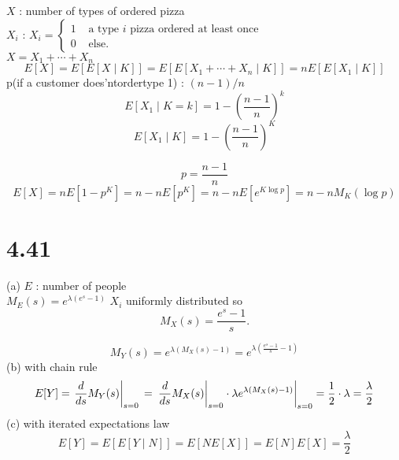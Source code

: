 \documentclass{article}
\begin{document}
		
		$X$ : number of types of ordered pizza \\
		$X_{i}$ : 
		$X_{i}= \begin{cases}1 & \text { a type } i \text { pizza ordered at least once } \\ 0 & \text { else. }\end{cases}$\\
		$X=X_{1}+\cdots+X_{n}$
		$$
		E[X]=E[E[X \mid K]]=E\left[E\left[X_{1}+\cdots+X_{n} \mid K\right]\right]=n E\left[E\left[X_{1} \mid K\right]\right]
		$$
		p(if a customer does'ntordertype 1) : $(n-1) / n$
		$$
		E\left[X_{1} \mid K=k\right]=1-\left(\frac{n-1}{n}\right)^{k}
		$$
		$$
		E\left[X_{1} \mid K\right]=1-\left(\frac{n-1}{n}\right)^{K}
		$$
		
		$$
		p=\frac{n-1}{n}
		$$
		$$
		E[X]=n E\left[1-p^{K}\right]=n-n E\left[p^{K}\right]=n-n E\left[e^{K \log p}\right]=n-n M_{K}(\log p)
		$$


	\section*{4.41}
		(a) $E$ : number of people \\
		$M_{E}(s)=e^{\lambda\left(e^{s}-1\right)}$
		$X_{i}$ uniformly distributed so
		$$
		M_{X}(s)=\frac{e^{s}-1}{s} .
		$$
		
		$$
		M_{Y}(s)=e^{\lambda\left(M_{X}(s)-1\right)}=e^{\lambda\left(\frac{e^{s}-1}{s}-1\right)}
		$$
		(b) with chain rule
		$$
		E[Y]\\
=\left.\frac{d}{d s} M_{Y}(s)\right|_{s=0}\\
=\left.\left.\frac{d}{d s} M_{X}(s)\right|_{s=0} \cdot \lambda e^{\lambda\left(M_{X}(s)-1\right)}\right|_{s=0}=\frac{1}{2} \cdot \lambda=\frac{\lambda}{2}
		$$
		(c) with iterated expectations law
		$$
		E[Y]=E[E[Y \mid N]]=E[N E[X]]=E[N] E[X]=\frac{\lambda}{2}
		$$
\end{document}

